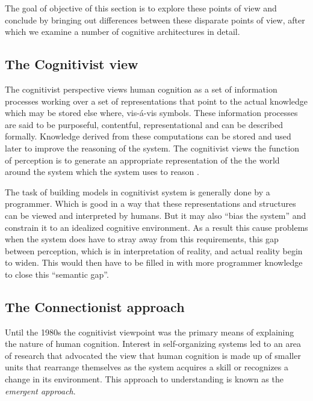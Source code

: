     The goal of objective of this section is to explore these points
    of view and conclude by bringing out differences between these
    disparate points of view, after which we examine a number of
    cognitive architectures in detail.
\subsection{The Cognitivist view}
     
     The cognitivist perspective views human cognition as a set of
     information processes working over a set of representations that
     point to the actual knowledge which may be stored else where,
     vis-\'{a}-vis symbols. These information processes are said to be
     purposeful, contentful, representational and can be described
     formally\cite{103009}. Knowledge derived from these computations
     can be stored and used later to improve the reasoning of the
     system. The cognitivist views the function of perception is to
     generate an appropriate representation of the the world around
     the system which the system uses to reason
     \cite{DBLP:journals/tec/VernonMS07}.

     The task of building models in cognitivist system is generally
     done by a programmer. Which is good in a way that these
     representations and structures can be viewed and interpreted by
     humans. But it may also ``bias the system'' and constrain it to an
     idealized cognitive environment. As a result this cause
     problems when the system does have to stray away from this
     requirements, this gap between perception, which is in
     interpretation of reality, and actual reality begin to
     widen. This would then have to be filled in with more programmer
     knowledge to close this ``semantic
     gap''\cite{DBLP:journals/tec/VernonMS07}. 
     
\subsection{The Connectionist approach}


     Until the 1980s the cognitivist viewpoint was the primary means
     of explaining the nature of human cognition. Interest in
     self-organizing systems led to an area of research that advocated
     the view that human cognition is made up of smaller units that
     rearrange themselves as the system acquires a skill or recognizes
     a change in its environment. This approach to understanding is
     known as the \emph{emergent approach}\cite{DBLP:journals/tec/VernonMS07}.
     
